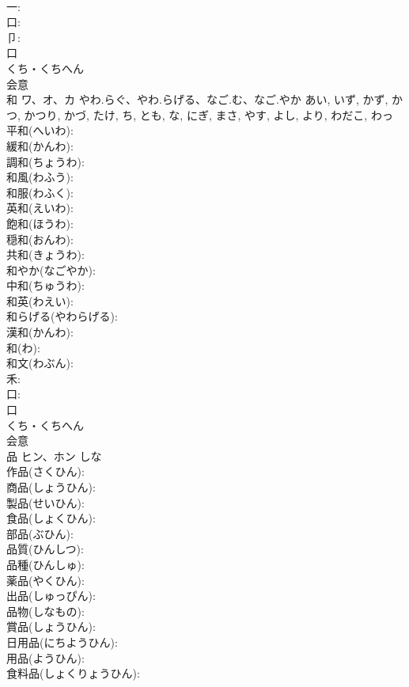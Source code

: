 \documentclass[8pt]{extreport}
\begin{document}
\begin{CJK}{UTF8}{min}
\\	一: 
\\	口: 
\\	卩: 
\\	口	
\\	くち・くちへん	
\\	会意 
\\	和	ワ、オ、カ	やわ.らぐ、やわ.らげる、なご.む、なご.やか	あい, いず, かず, かつ, かつり, かづ, たけ, ち, とも, な, にぎ, まさ, やす, よし, より, わだこ, わっ	
\\	平和(へいわ): 
\\	緩和(かんわ): 
\\	調和(ちょうわ): 
\\	和風(わふう): 
\\	和服(わふく): 
\\	英和(えいわ): 
\\	飽和(ほうわ): 
\\	穏和(おんわ): 
\\	共和(きょうわ): 
\\	和やか(なごやか): 
\\	中和(ちゅうわ): 
\\	和英(わえい): 
\\	和らげる(やわらげる): 
\\	漢和(かんわ): 
\\	和(わ): 
\\	和文(わぶん): 
\\	禾: 
\\	口: 
\\	口	
\\	くち・くちへん	
\\	会意 
\\	品	ヒン、ホン	しな		
\\	作品(さくひん): 
\\	商品(しょうひん): 
\\	製品(せいひん): 
\\	食品(しょくひん): 
\\	部品(ぶひん): 
\\	品質(ひんしつ): 
\\	品種(ひんしゅ): 
\\	薬品(やくひん): 
\\	出品(しゅっぴん): 
\\	品物(しなもの): 
\\	賞品(しょうひん): 
\\	日用品(にちようひん): 
\\	用品(ようひん): 
\\	食料品(しょくりょうひん): 

\end{CJK}
\end{document}
